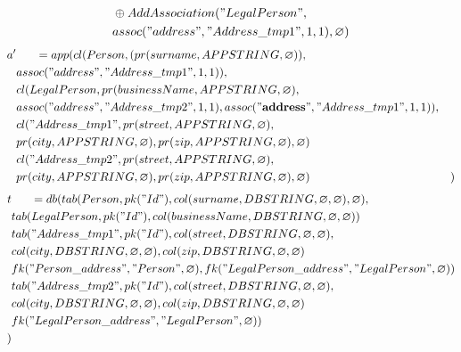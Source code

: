 \documentclass[11pt]{article}
\begin{document}
\newpage
\begin{align*}
& \oplus AddAssociation("LegalPerson", \\
& assoc("address", "Address\_tmp1", 1, 1),\varnothing) \\
\end{align*}
\hline
\begin{align*}
a' & \;\;\;\;\;\; =app(cl(Person, (pr(surname, APPSTRING, \varnothing)), \\ 
& assoc("address", "Address\_tmp1", 1, 1)), \\ 
& cl(LegalPerson, pr(businessName, APPSTRING, \varnothing),\\
& assoc("address", "Address\_tmp2", 1, 1), assoc(\mathbf{"address"}, "Address\_tmp1", 1, 1)), \\
& cl("Address\_tmp1", pr(street, APPSTRING, \varnothing), \\
& pr(city, APPSTRING, \varnothing), pr(zip, APPSTRING, \varnothing), \varnothing) \\
& cl("Address\_tmp2", pr(street, APPSTRING, \varnothing), \\
& pr(city, APPSTRING, \varnothing), pr(zip, APPSTRING, \varnothing), \varnothing)
& )
\end{align*}
\begin{align*}
t & \;\;\;\;\;\; =db(tab(Person, pk("Id"), col(surname, DBSTRING, \varnothing, \varnothing), \varnothing), \\
& tab(LegalPerson, pk("Id"),  col(businessName, DBSTRING, \varnothing, \varnothing)) \\
& tab("Address\_tmp1", pk("Id"), col(street, DBSTRING, \varnothing, \varnothing),\\
& col(city, DBSTRING, \varnothing, \varnothing), col(zip, DBSTRING, \varnothing, \varnothing) \\
& fk("Person\_address", "Person", \varnothing), fk("LegalPerson\_address", "LegalPerson", \varnothing))\\
& tab("Address\_tmp2", pk("Id"), col(street, DBSTRING, \varnothing, \varnothing),\\
& col(city, DBSTRING, \varnothing, \varnothing), col(zip, DBSTRING, \varnothing, \varnothing) \\
& fk("LegalPerson\_address", "LegalPerson", \varnothing))\\
) 
\end{align*}
\end{document}
